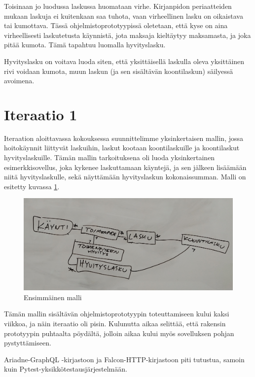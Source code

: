 Toisinaan jo luodussa laskussa huomataan virhe. Kirjanpidon
periaatteiden mukaan laskuja ei kuitenkaan saa tuhota, vaan virheellinen
lasku on oikaistava tai kumottava. Tässä ohjelmistoprototyypissä
oletetaan, että kyse on aina virheellisesti laskutetusta käynnistä, jota
maksaja kieltäytyy maksamasta, ja joka pitää kumota. Tämä tapahtuu
luomalla hyvityslasku.

Hyvityslasku on voitava luoda siten, että yksittäisellä laskulla oleva
yksittäinen rivi voidaan kumota, muun laskun (ja sen sisältävän
koontilaskun) säilyessä avoimena.

\hypertarget{iteraatio-1}{%
\section{Iteraatio 1}\label{iteraatio-1}}

Iteraation aloittavassa kokouksessa suunnittelimme yksinkertaisen
mallin, jossa hoitokäynnit liittyvät laskuihin, laskut kootaan
koontilaskuille ja koontilaskut hyvityslaskuille. Tämän mallin
tarkoituksena oli luoda yksinkertainen esimerkkisovellus, joka kykenee
laskuttamaan käyntejä, ja sen jälkeen lisäämään niitä hyvityslaskulle,
sekä näyttämään hyvityslaskun kokonaissumman. Malli on esitetty kuvassa
\ref{malli1}.

\begin{figure}
\centering
\includegraphics[width=\textwidth,height=0.3\textheight]{illustration/malli1.jpg}
\caption{\label{malli1} Ensimmäinen malli}
\end{figure}

Tämän mallin sisältävän ohjelmistoprototyypin toteuttamiseen kului kaksi
viikkoa, ja näin iteraatio oli pisin. Kulunutta aikaa selittää, että
rakensin prototyypin puhtaalta pöydältä, jolloin aikaa kului myös
sovelluksen pohjan pystyttämiseen.

Ariadne-GraphQL -kirjastoon ja Falcon-HTTP-kirjastoon piti tutustua,
samoin kuin Pytest-yksikkötestausjärjestelmään.

